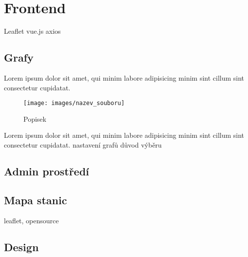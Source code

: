 \section{Frontend}
Leaflet
vue.js
axios

\subsection{Grafy}
Lorem ipsum dolor sit amet, qui minim labore adipisicing minim sint cillum sint consectetur cupidatat.
\begin{figure}[h]
    \centering
    \texttt{[image: images/nazev\_souboru]}
    \caption{Popisek}
    \label{graf_label}
\end{figure}
Lorem ipsum dolor sit amet, qui minim labore adipisicing minim sint cillum sint consectetur cupidatat.
nastavení grafů
důvod výběru
\subsection{Admin prostředí}

\subsection{Mapa stanic}
leaflet, opensource
\subsection{Design}
